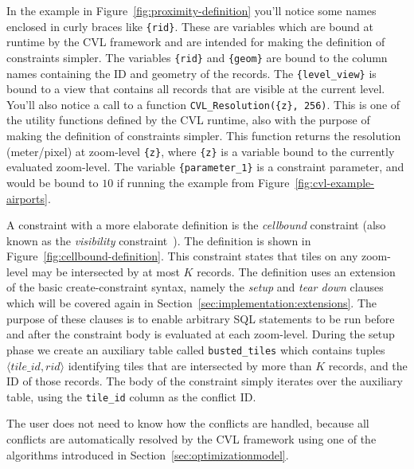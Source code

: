 In the example in Figure~\ref{fig:proximity-definition} you'll notice some names enclosed in curly braces like \texttt{\{rid\}}. These are variables which are bound at runtime by the CVL framework and are intended for making the definition of constraints simpler. The variables \texttt{\{rid\}} and \texttt{\{geom\}} are bound to the column names containing the ID and geometry of the records. The \texttt{\{level\_view\}} is bound to a view that contains all records that are visible at the current level. You'll also notice a call to a function \texttt{CVL\_Resolution(\{z\}, 256)}. This is one of the utility functions defined by the CVL runtime, also with the purpose of making the definition of constraints simpler. This function returns the resolution (meter/pixel) at zoom-level \texttt{\{z\}}, where \texttt{\{z\}} is a variable bound to the currently evaluated zoom-level. The variable \texttt{\{parameter\_1\}} is a constraint parameter, and would be bound to $10$ if running the example from Figure~\ref{fig:cvl-example-airports}.

A constraint with a more elaborate definition is the \emph{cellbound} constraint (also known as the \emph{visibility} constraint~\cite{sarma2012fusiontables}). The definition is shown in Figure~\ref{fig:cellbound-definition}. This constraint states that tiles on any zoom-level may be intersected by at most $K$ records. The definition uses an extension of the basic create-constraint syntax, namely the \emph{setup} and \emph{tear down} clauses which will be covered again in Section~\ref{sec:implementation:extensions}. The purpose of these clauses is to enable arbitrary SQL statements to be run before and after the constraint body is evaluated at each zoom-level. During the setup phase we create an auxiliary table called \texttt{busted\_tiles} which contains tuples $\langle tile\_id, rid \rangle$ identifying tiles that are intersected by more than $K$ records, and the ID of those records. The body of the constraint simply iterates over the auxiliary table, using the \texttt{tile\_id} column as the conflict ID.

The user does not need to know how the conflicts are handled, because all conflicts are automatically resolved by the CVL framework using one of the algorithms introduced in Section~\ref{sec:optimizationmodel}.


